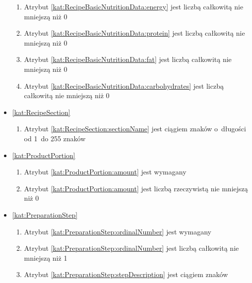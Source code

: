 \begin{itemize}[label={\textbf{Ograniczenia dla}}, wide, labelwidth=!, labelindent=0pt]
\begin{enumerate}[label={\textbf{OGR/3/\protect\twodigits{\arabic{enumi}}}}, wide, labelwidth=!, align=left, leftmargin=3cm, resume]
        \item Atrybut \ref{kat:RecipeBasicNutritionData:energy} jest liczbą całkowitą nie mniejszą niż 0
        \item Atrybut \ref{kat:RecipeBasicNutritionData:protein} jest liczbą całkowitą nie mniejszą niż 0
        \item Atrybut \ref{kat:RecipeBasicNutritionData:fat} jest liczbą całkowitą nie mniejszą niż 0
        \item Atrybut \ref{kat:RecipeBasicNutritionData:carbohydrates} jest liczbą całkowitą nie mniejszą niż 0
    \end{enumerate}

    \item\ref{kat:RecipeSection}\mynobreakpar
    \begin{enumerate}[label={\textbf{OGR/3/\protect\twodigits{\arabic{enumi}}}}, wide, labelwidth=!, align=left, leftmargin=3cm, resume]
        \item Atrybut \ref{kat:RecipeSection:sectionName} jest ciągiem znaków o~długości od 1~do 255 znaków
    \end{enumerate}

    \item\ref{kat:ProductPortion}\mynobreakpar
    \begin{enumerate}[label={\textbf{OGR/3/\protect\twodigits{\arabic{enumi}}}}, wide, labelwidth=!, align=left, leftmargin=3cm, resume]
        \item Atrybut \ref{kat:ProductPortion:amount} jest wymagany

        \item Atrybut \ref{kat:ProductPortion:amount} jest liczbą rzeczywistą nie mniejszą niż 0
    \end{enumerate}

    \item\ref{kat:PreparationStep}\mynobreakpar
    \begin{enumerate}[label={\textbf{OGR/3/\protect\twodigits{\arabic{enumi}}}}, wide, labelwidth=!, align=left, leftmargin=3cm, resume]
        \item Atrybut \ref{kat:PreparationStep:ordinalNumber} jest wymagany

        \item Atrybut \ref{kat:PreparationStep:ordinalNumber} jest liczbą całkowitą nie mniejszą niż 1
        \item Atrybut \ref{kat:PreparationStep:stepDescription} jest ciągiem znaków
    \end{enumerate}


\end{itemize}
